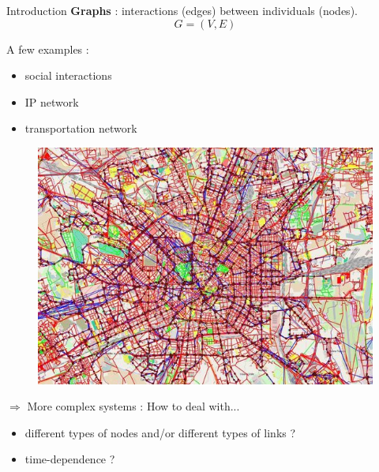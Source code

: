 \documentclass[15pt]{beamer}
\begin{document}
\begin{frame}{Introduction}
\textbf{Graphs} : interactions (edges) between individuals (nodes).
\[
	G=(V,E)
\]
\pause
\begin{minipage}{0.4\linewidth}
{\large A few examples :}
\begin{itemize}
    \item social interactions
    \item IP network
    \item transportation network
\end{itemize}
\end{minipage}
\pause
\begin{minipage}{0.5\linewidth}
\begin{figure}
	\centering
    \includegraphics[width=\textwidth]{img/multimodalTransport.jpg}
\end{figure}
\end{minipage}
\pause

$\Rightarrow$ {\large More complex systems : How to deal with...}
\begin{itemize}
	\item different types of nodes and/or different types of links ?
    \item time-dependence ?
\end{itemize}
\end{frame}
\end{document}
